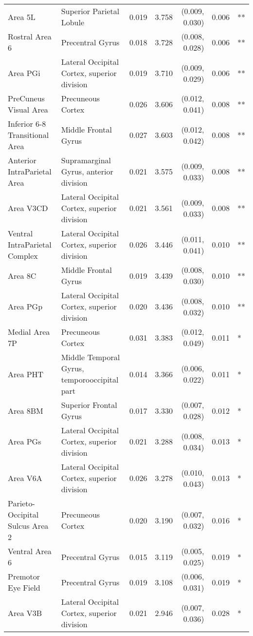 \begin{table}[ht]
{\begin{tabular}{llrrrrl}
Area 5L & Superior Parietal Lobule & 0.019 & 3.758 & (0.009, 0.030) & 0.006 & ** \\
Rostral Area 6 & Precentral Gyrus & 0.018 & 3.728 & (0.008, 0.028) & 0.006 & ** \\
Area PGi & Lateral Occipital Cortex, superior division & 0.019 & 3.710 & (0.009, 0.029) & 0.006 & ** \\
PreCuneus Visual Area & Precuneous Cortex & 0.026 & 3.606 & (0.012, 0.041) & 0.008 & ** \\
Inferior 6-8 Transitional Area & Middle Frontal Gyrus & 0.027 & 3.603 & (0.012, 0.042) & 0.008 & ** \\
Anterior IntraParietal Area & Supramarginal Gyrus, anterior division & 0.021 & 3.575 & (0.009, 0.033) & 0.008 & ** \\
Area V3CD & Lateral Occipital Cortex, superior division & 0.021 & 3.561 & (0.009, 0.033) & 0.008 & ** \\
Ventral IntraParietal Complex & Lateral Occipital Cortex, superior division & 0.026 & 3.446 & (0.011, 0.041) & 0.010 & ** \\
Area 8C & Middle Frontal Gyrus & 0.019 & 3.439 & (0.008, 0.030) & 0.010 & ** \\
Area PGp & Lateral Occipital Cortex, superior division & 0.020 & 3.436 & (0.008, 0.032) & 0.010 & ** \\
Medial Area 7P & Precuneous Cortex & 0.031 & 3.383 & (0.012, 0.049) & 0.011 & * \\
Area PHT & Middle Temporal Gyrus, temporooccipital part & 0.014 & 3.366 & (0.006, 0.022) & 0.011 & * \\
Area 8BM & Superior Frontal Gyrus & 0.017 & 3.330 & (0.007, 0.028) & 0.012 & * \\
Area PGs & Lateral Occipital Cortex, superior division & 0.021 & 3.288 & (0.008, 0.034) & 0.013 & * \\
Area V6A & Lateral Occipital Cortex, superior division & 0.026 & 3.278 & (0.010, 0.043) & 0.013 & * \\
Parieto-Occipital Sulcus Area 2 & Precuneous Cortex & 0.020 & 3.190 & (0.007, 0.032) & 0.016 & * \\
Ventral Area 6 & Precentral Gyrus & 0.015 & 3.119 & (0.005, 0.025) & 0.019 & * \\
Premotor Eye Field & Precentral Gyrus & 0.019 & 3.108 & (0.006, 0.031) & 0.019 & * \\
Area V3B & Lateral Occipital Cortex, superior division & 0.021 & 2.946 & (0.007, 0.036) & 0.028 & * \\

\end{tabular}}
\end{table}
